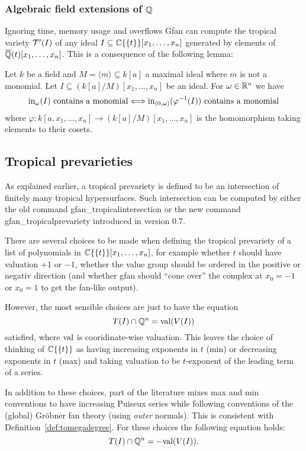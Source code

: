 \subsubsection{Algebraic field extensions of $\mathbb{Q}$}
Ignoring time, memory usage and overflows Gfan can compute the tropical variety $ \mathcal{T} '(I)$ of any ideal $I\subseteq {\ensuremath{\mathbb{C}\{\{t\}\}} }[x_1,\dots,x_n]$ generated by elements of $\overline{\mathbb{Q}}(t)[x_1,\dots,x_n]$. This is a consequence of the following lemma:
\begin{lemma}\cite[Lemma~3.12]{lifting}
\label{lem:fieldextension}
Let $k$ be a field and $M=\langle m\rangle\subseteq k[a]$ a maximal ideal where $m$ is not a monomial. Let 
$I\subseteq (k[a]/M)[x_1,\dots,x_n]$ be an ideal. For $\omega\in\mathbb{R}^n$ we
have
$$\textup{in}_\omega(I) \textup{ contains a monomial} \Longleftrightarrow \textup{in}_{(0,\omega)}(\varphi^{-1}(I)) \textup{ contains a monomial}$$ 
where $\varphi:k[a,x_1,\dots,x_n]\rightarrow (k[a]/M)[x_1,\dots,x_n]$ is the homomorphism taking elements to their cosets.
\end{lemma}

\subsection{Tropical prevarieties}
\label{subsec:tropicalprevariety}
As explained earlier, a tropical prevariety is defined to be an intersection of finitely many tropical hypersurfaces. Such intersection can be computed by either the old command {gfan\_tropicalintersection} or the new command {gfan\_tropicalprevariety} introduced in \name version 0.7.

There are several choices to be made when defining the tropical prevariety of a list of polynomials in ${\mathbb{C}\{\{t\}\} }[x_1,\dots,x_n]$, for example whether $t$ should have valuation $+1$ or $-1$, whether the value group should be ordered in the positive or negativ direction (and whether gfan should ``cone over'' the complex at $x_0=-1$ or $x_0=1$ to get the fan-like output).

However, the most sensible choices are just to have the equation $$T(I)\cap\mathbb{Q}^n=\textup{val}(V(I))$$ satisfied, where $\textup{val}$ is cooridinate-wise valuation. This leaves the choice of thinking of ${\mathbb{C}\{\{t\}\} }$ as having increasing exponents in $t$ (min) or decreasing exponents in $t$ (max) and taking valuation to be $t$-exponent of the leading term of a series. 

In addition to these choices, part of the literature mixes max and min conventions to have increasing Puiseux series while following conventions of the (global) Gr\"obner fan theory (using \emph{outer} normals). This is consistent with Definition~\ref{def:tomegadegree}.
For these choices the following equation holds:
$$T(I)\cap\mathbb{Q}^n=-\textup{val}(V(I)).$$

